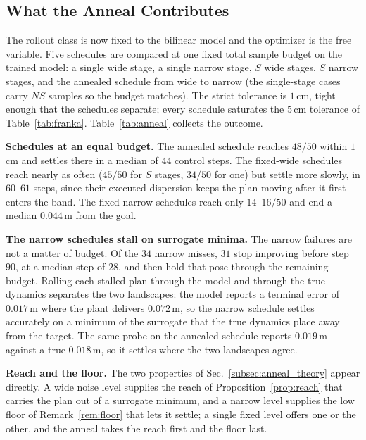 \documentclass[letterpaper,10pt,conference]{ieeeconf}
\begin{document}
\subsection{What the Anneal Contributes}\label{subsec:exp_anneal}

The rollout class is now fixed to the bilinear model and the optimizer is the free variable.
Five schedules are compared at one fixed total sample budget on the trained model: a single wide stage, a single narrow stage, $S$ wide stages, $S$ narrow stages, and the annealed schedule from wide to narrow (the single-stage cases carry $NS$ samples so the budget matches).
The strict tolerance is $1$\,cm, tight enough that the schedules separate; every schedule saturates the $5$\,cm tolerance of Table~\ref{tab:franka}.
Table~\ref{tab:anneal} collects the outcome.

\textbf{Schedules at an equal budget.}
The annealed schedule reaches $48/50$ within $1$\,cm and settles there in a median of $44$ control steps.
The fixed-wide schedules reach nearly as often ($45/50$ for $S$ stages, $34/50$ for one) but settle more slowly, in $60$--$61$ steps, since their executed dispersion keeps the plan moving after it first enters the band.
The fixed-narrow schedules reach only $14$--$16/50$ and end a median $0.044$\,m from the goal.

\textbf{The narrow schedules stall on surrogate minima.}
The narrow failures are not a matter of budget.
Of the $34$ narrow misses, $31$ stop improving before step $90$, at a median step of $28$, and then hold that pose through the remaining budget.
Rolling each stalled plan through the model and through the true dynamics separates the two landscapes: the model reports a terminal error of $0.017$\,m where the plant delivers $0.072$\,m, so the narrow schedule settles accurately on a minimum of the surrogate that the true dynamics place away from the target.
The same probe on the annealed schedule reports $0.019$\,m against a true $0.018$\,m, so it settles where the two landscapes agree.

\textbf{Reach and the floor.}
The two properties of Sec.~\ref{subsec:anneal_theory} appear directly.
A wide noise level supplies the reach of Proposition~\ref{prop:reach} that carries the plan out of a surrogate minimum, and a narrow level supplies the low floor of Remark~\ref{rem:floor} that lets it settle; a single fixed level offers one or the other, and the anneal takes the reach first and the floor last.
\end{document}
